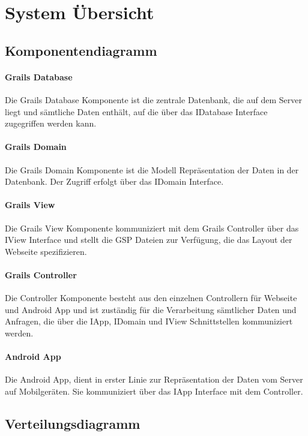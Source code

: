 \section{System \"Ubersicht}

\subsection{Komponentendiagramm}

\paragraph{Grails Database} Die Grails Database Komponente ist die zentrale Datenbank, die auf dem Server liegt und s\"amtliche Daten enth\"alt, auf die \"uber das IDatabase Interface zugegriffen werden kann.

\paragraph{Grails Domain} Die Grails Domain Komponente ist die Modell Repr\"asentation der Daten in der Datenbank. Der Zugriff erfolgt \"uber das IDomain Interface.

\paragraph{Grails View} Die Grails View Komponente kommuniziert mit dem Grails Controller \"uber das IView Interface und stellt die GSP Dateien zur Verf\"ugung, die das Layout der Webseite spezifizieren.

\paragraph{Grails Controller} Die Controller Komponente besteht aus den einzelnen Controllern f\"ur Webseite und Android App und ist zust\"andig f\"ur die Verarbeitung s\"amtlicher Daten und Anfragen, die \"uber die IApp, IDomain und IView Schnittstellen kommuniziert werden.

\paragraph{Android App} Die Android App, dient in erster Linie zur Repr\"asentation der Daten vom Server auf Mobilger\"aten. Sie kommuniziert \"uber das IApp Interface mit dem Controller.

\subsection{Verteilungsdiagramm}

